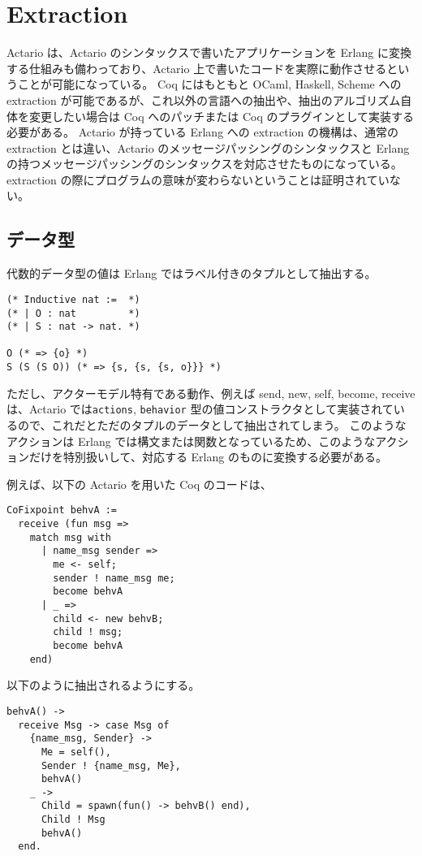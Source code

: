 \section{Extraction}
Actario は、Actario のシンタックスで書いたアプリケーションを Erlang に変換する仕組みも備わっており、Actario 上で書いたコードを実際に動作させるということが可能になっている。
Coq にはもともと OCaml, Haskell, Scheme への extraction が可能であるが、これ以外の言語への抽出や、抽出のアルゴリズム自体を変更したい場合は Coq へのパッチまたは Coq のプラグインとして実装する必要がある。
Actario が持っている Erlang への extraction の機構は、通常の extraction とは違い、Actario のメッセージパッシングのシンタックスと Erlang の持つメッセージパッシングのシンタックスを対応させたものになっている。
extraction の際にプログラムの意味が変わらないということは証明されていない。

\subsection{データ型}

代数的データ型の値は Erlang ではラベル付きのタプルとして抽出する。

\begin{lstlisting}
(* Inductive nat :=  *)
(* | O : nat         *)
(* | S : nat -> nat. *)

O (* => {o} *)
S (S (S O)) (* => {s, {s, {s, o}}} *)
\end{lstlisting}

ただし、アクターモデル特有である動作、例えば send, new, self, become, receive は、Actario では\texttt{actions}, \texttt{behavior} 型の値コンストラクタとして実装されているので、これだとただのタプルのデータとして抽出されてしまう。
このようなアクションは Erlang では構文または関数となっているため、このようなアクションだけを特別扱いして、対応する Erlang のものに変換する必要がある。

例えば、以下の Actario を用いた Coq のコードは、

\begin{lstlisting}
CoFixpoint behvA :=
  receive (fun msg =>
    match msg with
      | name_msg sender =>
        me <- self;
        sender ! name_msg me;
        become behvA
      | _ =>
        child <- new behvB;
        child ! msg;
        become behvA
    end)
\end{lstlisting}

以下のように抽出されるようにする。

\begin{lstlisting}
behvA() ->
  receive Msg -> case Msg of
    {name_msg, Sender} ->
      Me = self(),
      Sender ! {name_msg, Me},
      behvA()
    _ ->
      Child = spawn(fun() -> behvB() end),
      Child ! Msg
      behvA()
  end.
\end{lstlisting}
